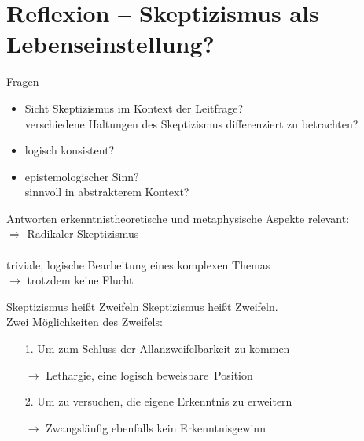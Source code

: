 \documentclass[12pt]{beamer}
\begin{document}
\section{Reflexion – Skeptizismus als Lebenseinstellung?}
\begin{frame}{Fragen}
\begin{itemize}
\item Sicht Skeptizismus im Kontext der Leitfrage?\\
verschiedene Haltungen des Skeptizismus differenziert zu betrachten?
\item logisch konsistent?
\item epistemologischer Sinn?\\
sinnvoll in abstrakterem Kontext? %
\end{itemize}
\end{frame}

\begin{frame}{Antworten}
erkenntnistheoretische und metaphysische Aspekte relevant:\\
$\Rightarrow$ Radikaler Skeptizismus\\
\ \\
\glqq triviale\grqq , logische Bearbeitung eines komplexen Themas\\
$\rightarrow$ trotzdem keine \glqq Flucht\grqq
\end{frame}

\begin{frame}{Skeptizismus heißt Zweifeln}
Skeptizismus heißt Zweifeln.\\
Zwei Möglichkeiten des Zweifels:
\begin{itemize}
\item[1.] Um zum Schluss der Allanzweifelbarkeit zu kommen\\
\item[$\rightarrow$] Lethargie, eine logisch \glqq beweisbare\grqq\ Position
\item[2.] Um zu versuchen, die eigene Erkenntnis zu erweitern
\item[$\rightarrow$] Zwangsläufig ebenfalls kein Erkenntnisgewinn
\end{itemize}
\end{frame}
\end{document}
